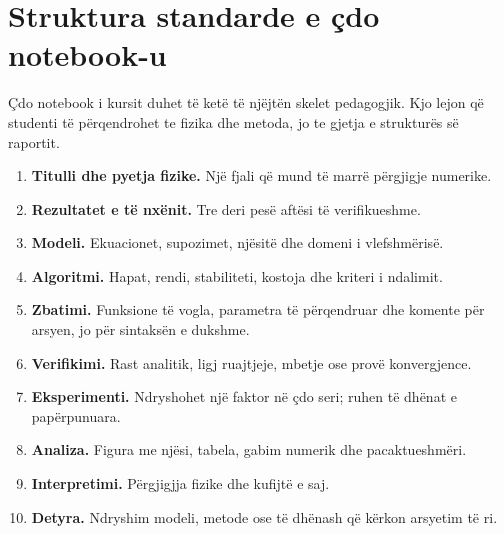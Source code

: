 \documentclass[11pt,oneside,openany]{book}
\begin{document}
\section{Struktura standarde e çdo notebook-u}
Çdo notebook i kursit duhet të ketë të njëjtën skelet pedagogjik. Kjo lejon që studenti të përqendrohet te fizika dhe metoda, jo te gjetja e strukturës së raportit.

\begin{enumerate}
\item \textbf{Titulli dhe pyetja fizike.} Një fjali që mund të marrë përgjigje numerike.
\item \textbf{Rezultatet e të nxënit.} Tre deri pesë aftësi të verifikueshme.
\item \textbf{Modeli.} Ekuacionet, supozimet, njësitë dhe domeni i vlefshmërisë.
\item \textbf{Algoritmi.} Hapat, rendi, stabiliteti, kostoja dhe kriteri i ndalimit.
\item \textbf{Zbatimi.} Funksione të vogla, parametra të përqendruar dhe komente për arsyen, jo për sintaksën e dukshme.
\item \textbf{Verifikimi.} Rast analitik, ligj ruajtjeje, mbetje ose provë konvergjence.
\item \textbf{Eksperimenti.} Ndryshohet një faktor në çdo seri; ruhen të dhënat e papërpunuara.
\item \textbf{Analiza.} Figura me njësi, tabela, gabim numerik dhe pacaktueshmëri.
\item \textbf{Interpretimi.} Përgjigjja fizike dhe kufijtë e saj.
\item \textbf{Detyra.} Ndryshim modeli, metode ose të dhënash që kërkon arsyetim të ri.
\end{enumerate}
\end{document}
